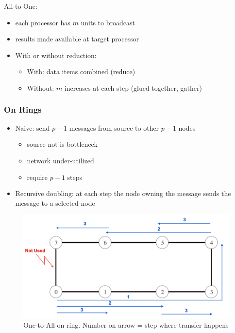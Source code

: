 \documentclass[11pt,a4paper]{report}
\begin{document}
All-to-One:

\begin{itemize}
    \item each processor has \(m\) units to broadcast
    \item results made available at target processor
    \item With or without reduction:
    \begin{itemize}
        \item With: data items combined (reduce)
        \item Without: \(m\) increases at each step (glued together, gather)
    \end{itemize}
\end{itemize}

\subsubsection{On Rings}

\begin{itemize}
    \item Naive: send $p-1$ messages from source to other $p-1$ nodes
    \begin{itemize}
        \item source not is bottleneck
        \item network under-utilized
        \item require $p-1$ steps
    \end{itemize}
    
    \item Recursive doubling: at each step the node owning the message sends 
    the message to a selected node
\end{itemize}

\begin{figure}[H]
    \centering
    \includegraphics[width=0.7\linewidth]{img/comm_ring_one-to-all}
    \caption{One-to-All on ring. Number on arrow = step where transfer happens}
    \label{fig:commoneallring}
\end{figure}
\end{document}
